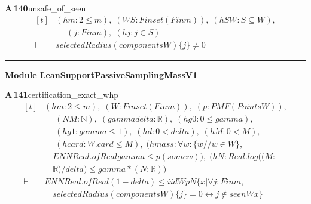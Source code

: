 \documentclass[conference]{IEEEtran}
\theoremstyle{definition}
\newcommand{\lean}[1]{\textsf{\footnotesize #1}}
\begin{document}
\noindent\textbf{A\,140}\quad\lean{unsafe\_of\_seen}
{\footnotesize\[ \begin{aligned}[t]
&(\mathit{hm} : 2 \leq \mathit{m}),\; (\mathit{W} \mathit{S} : \mathit{Finset} (\mathit{Fin} \mathit{m})),\; (\mathit{hSW} : \mathit{S} \subseteq \mathit{W}),\\
&\quad \; (\mathit{j} : \mathit{Fin} \mathit{m}),\; (\mathit{hj} : \mathit{j} \in \mathit{S})\\
\vdash\;&\mathit{selectedRadius} (\mathit{components} \mathit{W}) \{ \mathit{j}\} \neq 0
\end{aligned} \]}

\vspace{4pt}\noindent\rule{\columnwidth}{0.4pt}\par\vspace{2pt}
\noindent\textbf{Module \lean{LeanSupportPassiveSamplingMassV1}}\par\vspace{3pt}

\noindent\textbf{A\,141}\quad\lean{certification\_exact\_whp}
{\footnotesize\[ \begin{aligned}[t]
&(\mathit{hm} : 2 \leq \mathit{m}),\; (\mathit{W} : \mathit{Finset} (\mathit{Fin} \mathit{m})),\; (\mathit{p} : \mathit{PMF} (\mathit{Points} \mathit{W})),\\
&\quad \; (\mathit{N} \mathit{M} : \mathbb{N} ),\; (\mathit{gamma} \mathit{delta} : \mathbb{R} ),\; (\mathit{hg0} : 0 \leq \mathit{gamma}),\\
&\quad \; (\mathit{hg1} : \mathit{gamma} \leq 1),\; (\mathit{hd} : 0 < \mathit{delta}),\; (\mathit{hM} : 0 < \mathit{M}),\\
&\quad \; (\mathit{hcard} : \mathit{W}.\mathit{card} \leq \mathit{M}),\; (\mathit{hmass} : \forall \mathit{w} : \{ \mathit{w} // \mathit{w} \in \mathit{W}\} ,\\
&\quad \mathit{ENNReal}.\mathit{ofReal} \mathit{gamma} \leq \mathit{p} (\mathit{some} \mathit{w})),\; (\mathit{hN} : \mathit{Real}.\mathit{log} ((\mathit{M}:\\
&\quad \mathbb{R} )/\mathit{delta}) \leq \mathit{gamma}*(\mathit{N}:\mathbb{R} ))\\
\vdash\;&\mathit{ENNReal}.\mathit{ofReal} (1-\mathit{delta}) \leq \mathit{iid} \mathit{W} \mathit{p} \mathit{N} \{ \mathit{x} | \forall \mathit{j} : \mathit{Fin} \mathit{m},\\
&\quad \mathit{selectedRadius} (\mathit{components} \mathit{W}) \{ \mathit{j}\} = 0 \leftrightarrow \mathit{j} \notin \mathit{seen} \mathit{W} \mathit{x}\}
\end{aligned} \]}
\end{document}
